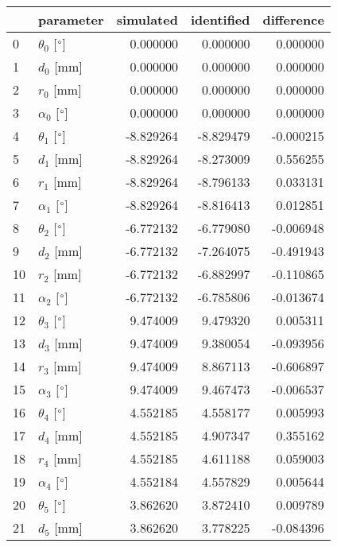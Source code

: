 \documentclass{standalone}%
\begin{document}
%
\normalsize%
\begin{tabular}{llrrr}
\toprule
{} &                 parameter & simulated & identified & difference \\
\midrule
0  &  $\theta_{0}$ [$\degree$] &  0.000000 &   0.000000 &   0.000000 \\
1  &              $d_{0}$ [mm] &  0.000000 &   0.000000 &   0.000000 \\
2  &              $r_{0}$ [mm] &  0.000000 &   0.000000 &   0.000000 \\
3  &  $\alpha_{0}$ [$\degree$] &  0.000000 &   0.000000 &   0.000000 \\
4  &  $\theta_{1}$ [$\degree$] & -8.829264 &  -8.829479 &  -0.000215 \\
5  &              $d_{1}$ [mm] & -8.829264 &  -8.273009 &   0.556255 \\
6  &              $r_{1}$ [mm] & -8.829264 &  -8.796133 &   0.033131 \\
7  &  $\alpha_{1}$ [$\degree$] & -8.829264 &  -8.816413 &   0.012851 \\
8  &  $\theta_{2}$ [$\degree$] & -6.772132 &  -6.779080 &  -0.006948 \\
9  &              $d_{2}$ [mm] & -6.772132 &  -7.264075 &  -0.491943 \\
10 &              $r_{2}$ [mm] & -6.772132 &  -6.882997 &  -0.110865 \\
11 &  $\alpha_{2}$ [$\degree$] & -6.772132 &  -6.785806 &  -0.013674 \\
12 &  $\theta_{3}$ [$\degree$] &  9.474009 &   9.479320 &   0.005311 \\
13 &              $d_{3}$ [mm] &  9.474009 &   9.380054 &  -0.093956 \\
14 &              $r_{3}$ [mm] &  9.474009 &   8.867113 &  -0.606897 \\
15 &  $\alpha_{3}$ [$\degree$] &  9.474009 &   9.467473 &  -0.006537 \\
16 &  $\theta_{4}$ [$\degree$] &  4.552185 &   4.558177 &   0.005993 \\
17 &              $d_{4}$ [mm] &  4.552185 &   4.907347 &   0.355162 \\
18 &              $r_{4}$ [mm] &  4.552185 &   4.611188 &   0.059003 \\
19 &  $\alpha_{4}$ [$\degree$] &  4.552184 &   4.557829 &   0.005644 \\
20 &  $\theta_{5}$ [$\degree$] &  3.862620 &   3.872410 &   0.009789 \\
21 &              $d_{5}$ [mm] &  3.862620 &   3.778225 &  -0.084396 \\

\end{tabular}
\end{document}
